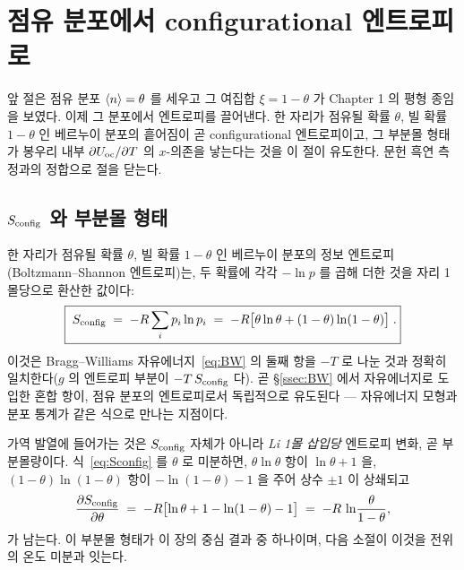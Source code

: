 \section{점유 분포에서 configurational 엔트로피로}\label{sec:config}

앞 절은 점유 분포 $\langle n\rangle=\theta$ 를 세우고 그 여집합 $\xi=1-\theta$ 가 Chapter 1 의 평형 종임을 보였다. 이제
그 분포에서 엔트로피를 끌어낸다. 한 자리가 점유될 확률 $\theta$, 빌 확률 $1-\theta$ 인 베르누이 분포의
흩어짐이 곧 configurational 엔트로피이고, 그 부분몰 형태가 봉우리 내부 $\partial U_{\mathrm{oc}}/\partial T$ 의 $x$-의존을
낳는다는 것을 이 절이 유도한다. 문헌 흑연 측정과의 정합으로 절을 닫는다.

\subsection{$S_{\mathrm{config}}$ 와 부분몰 형태}\label{ssec:sconfig}
한 자리가 점유될 확률 $\theta$, 빌 확률 $1-\theta$ 인 베르누이 분포의 정보 엔트로피(Boltzmann--Shannon
엔트로피)는, 두 확률에 각각 $-\ln p$ 를 곱해 더한 것을 자리 1몰당으로 환산한 값이다:
\begin{equation}
\boxed{\;S_{\mathrm{config}} \;=\; -R\sum_i p_i\ln p_i
\;=\; -R\bigl[\theta\ln\theta + (1-\theta)\ln(1-\theta)\bigr]\;.}
\label{eq:Sconfig}
\end{equation}
이것은 Bragg--Williams 자유에너지~\eqref{eq:BW} 의 둘째 항을 $-T$ 로 나눈 것과 정확히 일치한다($g$ 의 엔트로피
부분이 $-T\,S_{\mathrm{config}}$ 다). 곧 \S\ref{ssec:BW} 에서 자유에너지로 도입한 혼합 항이, 점유 분포의 엔트로피로서
독립적으로 유도된다 --- 자유에너지 모형과 분포 통계가 같은 식으로 만나는 지점이다.

가역 발열에 들어가는 것은 $S_{\mathrm{config}}$ 자체가 아니라 \emph{Li 1몰 삽입당} 엔트로피 변화, 곧 부분몰량이다.
식~\eqref{eq:Sconfig} 를 $\theta$ 로 미분하면, $\theta\ln\theta$ 항이 $\ln\theta+1$ 을, $(1-\theta)\ln(1-\theta)$
항이 $-\ln(1-\theta)-1$ 을 주어 상수 $\pm1$ 이 상쇄되고
\begin{equation}
\frac{\partial S_{\mathrm{config}}}{\partial\theta}
\;=\; -R\bigl[\ln\theta + 1 - \ln(1-\theta) - 1\bigr]
\;=\; -R\,\ln\!\frac{\theta}{1-\theta},
\label{eq:dSconfig}
\end{equation}
가 남는다. 이 부분몰 형태가 이 장의 중심 결과 중 하나이며, 다음 소절이 이것을 전위의 온도 미분과 잇는다.

